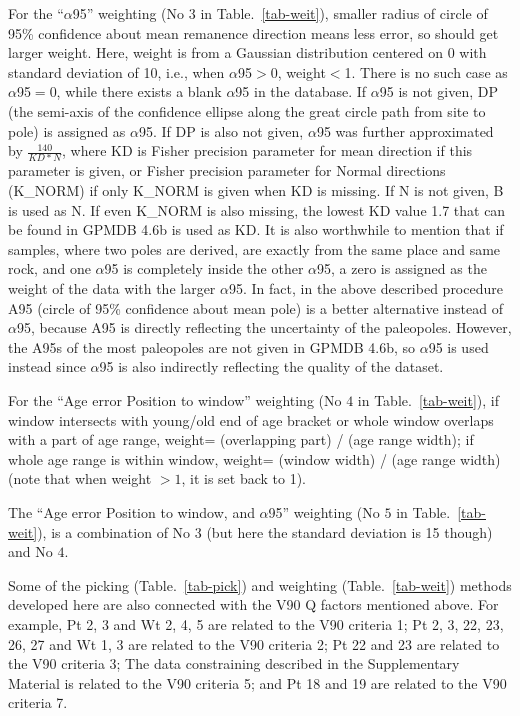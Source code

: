 For the ``$\alpha$95'' weighting (No $3$ in Table.~\ref{tab-weit}), smaller
radius of circle of 95\% confidence about mean remanence direction means less
error, so should get larger weight. Here, weight is from a Gaussian distribution
centered on 0 with standard deviation of 10, i.e., when $\alpha$95$>$0,
weight$<$1. There is no such case as $\alpha$95$=$0, while there exists a blank
$\alpha$95 in the database. If $\alpha$95 is not given, DP (the semi-axis of
the confidence ellipse along the great circle path from site to pole) is
assigned as $\alpha$95. If DP is also not given, $\alpha$95 was further
approximated by $\frac{140}{KD*N}$, where KD is Fisher precision parameter for
mean direction if this parameter is given, or Fisher precision parameter for
Normal directions (K\_NORM) if only K\_NORM is given when KD is missing. If N is
not given, B is used as N. If even K\_NORM is also missing, the lowest KD value
1.7 that can be found in GPMDB 4.6b is used as KD\@. It is also worthwhile to
mention that if samples, where two poles are derived, are exactly from the same
place and same rock, and one $\alpha$95 is completely inside the other
$\alpha$95, a zero is assigned as the weight of the data with the larger
$\alpha$95. In fact, in the above described procedure A95 (circle of 95\%
confidence about mean pole) is a better alternative instead of $\alpha$95,
because A95 is directly reflecting the uncertainty of the paleopoles. However,
the A95s of the most paleopoles are not given in GPMDB 4.6b, so $\alpha$95 is
used instead since $\alpha$95 is also indirectly reflecting the quality of the
dataset.

For the ``Age error Position to window'' weighting (No $4$ in
Table.~\ref{tab-weit}), if window intersects with young/old end of age bracket
or whole window overlaps with a part of age range, weight= (overlapping part)
/ (age range width); if whole age range is within window, weight= (window width)
/ (age range width) (note that when weight $>1$, it is set back to 1).

The ``Age error Position to window, and $\alpha$95'' weighting (No $5$ in
Table.~\ref{tab-weit}), is a combination of No $3$ (but here the standard
deviation is 15 though) and No $4$.

Some of the picking (Table.~\ref{tab-pick}) and weighting
(Table.~\ref{tab-weit}) methods developed here are also connected with the V90 Q
factors mentioned above. For example, Pt 2, 3 and Wt 2, 4, 5 are related to the
V90 criteria 1; Pt 2, 3, 22, 23, 26, 27 and Wt 1, 3 are related to the V90
criteria 2; Pt 22 and 23 are related to the V90 criteria 3; The data
constraining described in the Supplementary Material is related to the V90
criteria 5; and Pt 18 and 19 are related to the V90 criteria 7.


